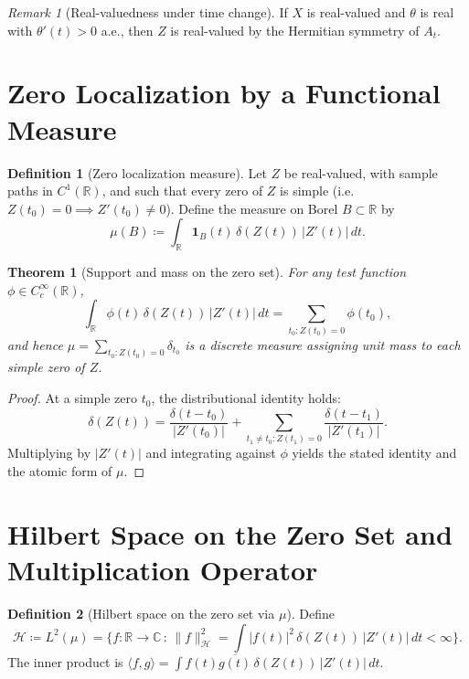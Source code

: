 \documentclass[12pt]{article}
\newtheorem{theorem}{Theorem}
\theoremstyle{definition}
\newtheorem{definition}{Definition}
\theoremstyle{remark}
\newtheorem{remark}{Remark}
\begin{document}
\begin{remark}[Real-valuedness under time change]
If $X$ is real-valued and $\theta$ is real with $\theta'(t)>0$ a.e., then $Z$ is real-valued by the Hermitian symmetry of $A_t$.
\end{remark}

\section{Zero Localization by a Functional Measure}

\begin{definition}[Zero localization measure]
Let $Z$ be real-valued, with sample paths in $C^1(\mathbb{R})$, and such that every zero of $Z$ is simple (i.e.\ $Z(t_0)=0\implies Z'(t_0)\neq 0$). Define the measure on Borel $B\subset\mathbb{R}$ by
\begin{equation}
  \mu(B)\coloneqq \int_{\mathbb{R}} \mathbf{1}_B(t)\,\delta(Z(t))\,|Z'(t)|\,dt.
\end{equation}
\end{definition}

\begin{theorem}[Support and mass on the zero set]
For any test function $\phi\in C_c^\infty(\mathbb{R})$,
\begin{equation}
  \int_{\mathbb{R}} \phi(t)\,\delta(Z(t))\,|Z'(t)|\,dt
  = \sum_{t_0: Z(t_0)=0} \phi(t_0),
\end{equation}
and hence $\mu=\sum_{t_0: Z(t_0)=0} \delta_{t_0}$ is a discrete measure assigning unit mass to each simple zero of $Z$.
\end{theorem}

\begin{proof}
At a simple zero $t_0$, the distributional identity holds:
\[
\delta(Z(t))=\frac{\delta(t-t_0)}{|Z'(t_0)|}+\sum_{t_1\neq t_0: Z(t_1)=0}\frac{\delta(t-t_1)}{|Z'(t_1)|}.
\]
Multiplying by $|Z'(t)|$ and integrating against $\phi$ yields the stated identity and the atomic form of $\mu$.
\end{proof}

\section{Hilbert Space on the Zero Set and Multiplication Operator}

\begin{definition}[Hilbert space on the zero set via $\mu$]
Define
\[
\mathcal{H}\coloneqq L^2(\mu)
=\Big\{ f:\mathbb{R}\to\mathbb{C}\,:\, \|f\|_{\mathcal{H}}^2=\int |f(t)|^2\,\delta(Z(t))\,|Z'(t)|\,dt<\infty\Big\}.
\]
The inner product is $\langle f,g\rangle=\int f(t)\overline{g(t)}\,\delta(Z(t))\,|Z'(t)|\,dt$.
\end{definition}
\end{document}
